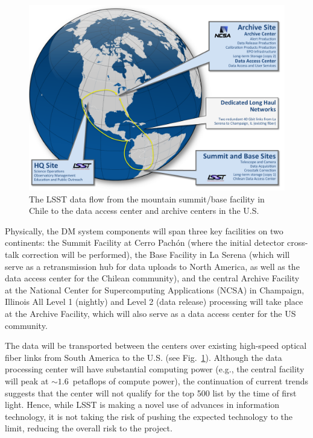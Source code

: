 \documentclass{emulateapj}
\begin{document}
\begin{figure}
%
%
\hskip 0.25in
\includegraphics[width=0.95\hsize,clip]{DMX2.pdf}
\caption{The LSST data flow from the mountain summit/base facility in
Chile to the data access center and archive centers in the U.S.}
\label{Fig:DM2}
\end{figure}

Physically, the DM system components will span three key facilities on two 
continents: the Summit Facility at  Cerro Pach\'on (where the initial
detector cross-talk 
correction will be performed), the Base Facility in La Serena (which will serve
as a retransmission hub for data 
uploads to North America, as well as the data access center for the Chilean
community), and the central Archive Facility at the National Center
for Supercomputing Applications (NCSA) in Champaign, Illinois
All Level 1 (nightly) and Level 2 (data release) processing will take place at the
Archive Facility, which will also serve as a data access center
for the US community.

The data will be transported between the centers over existing high-speed optical fiber 
links from South America to the U.S. (see Fig.~\ref{Fig:DM2}).
Although the data processing center will have substantial computing 
power (e.g., the central facility will peak at $\sim 1.6$~petaflops of 
compute power), the continuation of current trends suggests that the center will 
not qualify for the top 500 list by the time of first light.
Hence, while LSST is making a novel use of advances in information technology, 
it is not taking the risk of pushing the expected technology to the limit, reducing
the overall risk to the project. 
\\
\end{document}
